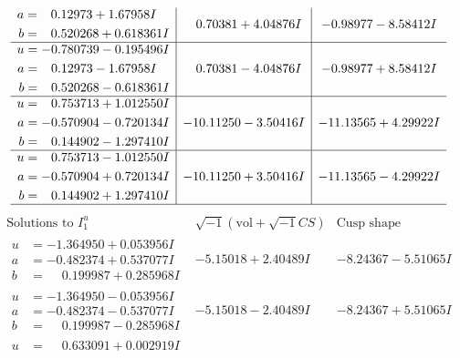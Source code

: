 \documentclass[1p]{elsarticle_modified}
\theoremstyle{definition}
\newcommand{\I}{\sqrt{-1}}
\begin{document}
$$\begin{array}{c|c|c}
\begin{aligned}
a &= \phantom{-}0.12973 + 1.67958 I \\
b &= \phantom{-}0.520268 + 0.618361 I\end{aligned}
 & \phantom{-}0.70381 + 4.04876 I & -0.98977 - 8.58412 I \\ \hline\begin{aligned}
u &= -0.780739 - 0.195496 I \\
a &= \phantom{-}0.12973 - 1.67958 I \\
b &= \phantom{-}0.520268 - 0.618361 I\end{aligned}
 & \phantom{-}0.70381 - 4.04876 I & -0.98977 + 8.58412 I \\ \hline\begin{aligned}
u &= \phantom{-}0.753713 + 1.012550 I \\
a &= -0.570904 - 0.720134 I \\
b &= \phantom{-}0.144902 - 1.297410 I\end{aligned}
 & -10.11250 - 3.50416 I & -11.13565 + 4.29922 I \\ \hline\begin{aligned}
u &= \phantom{-}0.753713 - 1.012550 I \\
a &= -0.570904 + 0.720134 I \\
b &= \phantom{-}0.144902 + 1.297410 I\end{aligned}
 & -10.11250 + 3.50416 I & -11.13565 - 4.29922 I\\
 \hline 
 \end{array}$$\newpage$$\begin{array}{c|c|c}  
\text{Solutions to }I^u_{1}& \I (\text{vol} + \sqrt{-1}CS) & \text{Cusp shape}\\
 \hline 
\begin{aligned}
u &= -1.364950 + 0.053956 I \\
a &= -0.482374 + 0.537077 I \\
b &= \phantom{-}0.199987 + 0.285968 I\end{aligned}
 & -5.15018 + 2.40489 I & -8.24367 - 5.51065 I \\ \hline\begin{aligned}
u &= -1.364950 - 0.053956 I \\
a &= -0.482374 - 0.537077 I \\
b &= \phantom{-}0.199987 - 0.285968 I\end{aligned}
 & -5.15018 - 2.40489 I & -8.24367 + 5.51065 I \\ \hline\begin{aligned}
u &= \phantom{-}0.633091 + 0.002919 I \\

\end{aligned}
\end{array}$$
\end{document}
